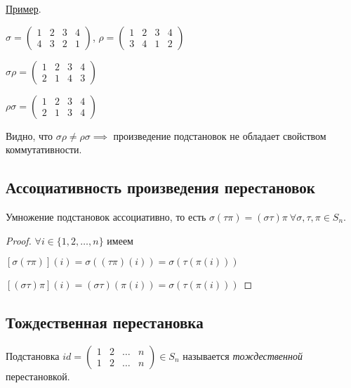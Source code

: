 \underline{Пример}.

$\sigma = \begin{pmatrix}
    1 & 2 & 3 & 4 \\
    4 & 3 & 2 & 1
\end{pmatrix}$, $\rho = \begin{pmatrix}
    1 & 2 & 3 & 4 \\
    3 & 4 & 1 & 2
\end{pmatrix}$

$\sigma \rho = \begin{pmatrix}
    1 & 2 & 3 & 4 \\
    2 & 1 & 4 & 3
\end{pmatrix}$

$\rho \sigma = \begin{pmatrix}
    1 & 2 & 3 & 4 \\
    2 & 1 & 3 & 4
\end{pmatrix}$

Видно, что $\sigma \rho \neq \rho \sigma \implies$ произведение подстановок не обладает свойством коммутативности.

\subsection{Ассоциативность произведения перестановок}
\begin{proposition}
    Умножение подстановок ассоциативно, то есть $\sigma (\tau \pi) = (\sigma \tau) \pi \ \forall \sigma, \tau, \pi \in S_n$.
\end{proposition}

\begin{proof}
    $\forall i \in \{1, 2, \dots, n\}$ имеем

    $[\sigma(\tau \pi)](i) = \sigma((\tau \pi)(i)) = \sigma(\tau(\pi(i)))$

    $[(\sigma \tau) \pi](i) = (\sigma \tau)(\pi(i)) = \sigma(\tau(\pi(i)))$
\end{proof}


\subsection{Тождественная перестановка}
\begin{definition}
    Подстановка $id = \begin{pmatrix}
        1 & 2 & \dots & n \\
        1 & 2 & \dots & n
    \end{pmatrix} \in S_n$ называется \textit{тождественной} перестановкой.
\end{definition}

